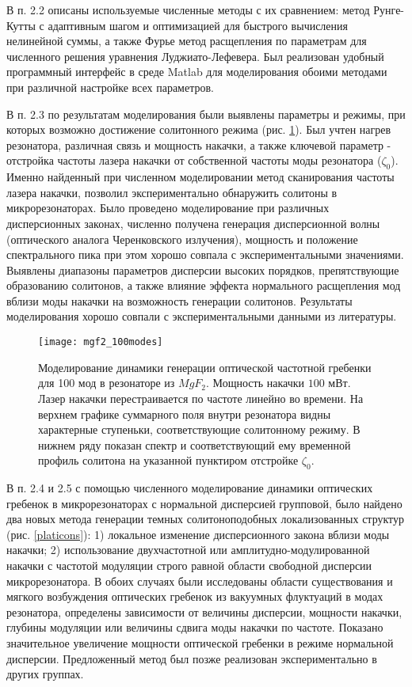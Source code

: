 В п. 2.2 описаны используемые численные методы с их сравнением: метод Рунге-Кутты с адаптивным шагом и оптимизацией для быстрого вычисления нелинейной суммы, а также Фурье метод расщепления по параметрам для численного решения уравнения Луджиато-Лефевера. Был реализован удобный программный интерфейс в среде Matlab для моделирования обоими методами при различной настройке всех параметров.

В п. 2.3 по результатам моделирования были выявлены параметры и режимы, при которых возможно достижение солитонного режима (рис. \ref{100modes}). Был учтен нагрев резонатора, различная связь и мощность накачки, а также ключевой параметр - отстройка частоты лазера накачки от собственной частоты моды резонатора ($\zeta_0$). Именно найденный при численном моделировании метод сканирования частоты лазера накачки, позволил экспериментально обнаружить солитоны в микрорезонаторах. Было проведено моделирование при различных дисперсионных законах, численно получена генерация дисперсионной волны (оптического аналога Черенковского излучения), мощность и положение спектрального пика при этом хорошо совпала с экспериментальными значениями. Выявлены диапазоны параметров дисперсии высоких порядков, препятствующие образованию солитонов, а также влияние эффекта нормального расщепления мод вблизи моды накачки на возможность генерации солитонов. Результаты моделирования хорошо совпали с экспериментальными данными из литературы.

\begin{figure}
  \centering
  \texttt{[image: mgf2\_100modes]}
  \caption{Моделирование динамики генерации оптической частотной гребенки для 100 мод в резонаторе из $MgF_2$. Мощность накачки $100$ мВт. Лазер накачки перестраивается по частоте линейно во времени. На верхнем графике суммарного поля внутри резонатора видны характерные ступеньки, соответствующие солитонному режиму. В нижнем ряду показан спектр и соответствующий ему временной профиль солитона на указанной пунктиром отстройке $\zeta_0$.}
  \label{100modes}
\end{figure}

В п. 2.4 и 2.5 с помощью численного моделирование динамики оптических гребенок в микрорезонаторах с нормальной дисперсией групповой, было найдено два новых метода генерации темных солитоноподобных локализованных структур (рис. \ref{platicons}): 1) локальное изменение дисперсионного закона вблизи моды накачки; 2) использование двухчастотной или амплитудно-модулированной накачки с частотой модуляции строго равной области свободной дисперсии микрорезонатора. В обоих случаях были исследованы области существования и мягкого возбуждения оптических гребенок из вакуумных флуктуаций в модах резонатора, определены зависимости от величины дисперсии, мощности накачки, глубины модуляции или величины сдвига моды накачки по частоте. Показано значительное увеличение мощности оптической гребенки в режиме нормальной дисперсии. Предложенный метод был позже реализован экспериментально в других группах.

